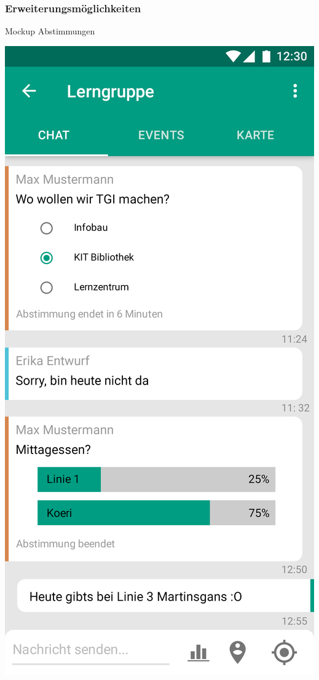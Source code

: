 \documentclass[aspectratio=1610]{beamer}
\begin{document}
  \begin{frame}[plain]
      \frametitle{\textbf{Erweiterungsmöglichkeiten}}
		\begin{minipage}{0.45\textwidth}
			Mockup Abstimmungen
		\end{minipage}	
		\begin{minipage}{0.45\textwidth}
			\includegraphics[height = \paperheight - 50pt]{images/gui-mockups/group_chat_buttons.png}
		\end{minipage}
  \end{frame}
  
\end{document}
